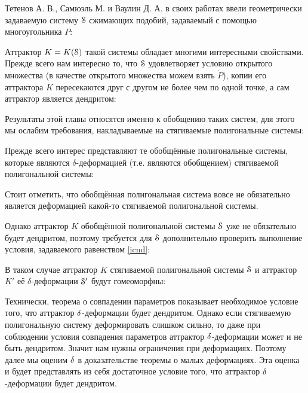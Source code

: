 Тетенов А. В., Самюэль М. и Ваулин Д. А. в своих работах \cite{TSV2017, STV2017} ввели геометрически задаваемую систему ${\EuScript S}$ сжимающих подобий, задаваемый с помощью многоугольника $P$:


Аттрактор $K=K({\EuScript S})$ такой системы обладает многими интересными свойствами.
Прежде всего нам интересно то, что ${\EuScript S}$ удовлетворяет условию открытого множества (в качестве открытого множества можем взять $\dot P$), копии его аттрактора $K$ пересекаются друг с другом не более чем по одной точке, а сам аттрактор является дендритом:


Результаты этой главы относятся именно к обобщению таких систем, для этого мы ослабим требования, накладываемые на стягиваемые полигональные системы:


Прежде всего интерес представляют те обобщённые полигональные системы, которые являются $\delta$-деформацией (т.е. являются обобщением) стягиваемой полигональной системы:


Стоит отметить, что обобщённая полигональная система вовсе не обязательно является деформацией какой-то стягиваемой полигональной системы.

Однако аттрактор $K$ обобщённой полигональной системы ${\EuScript S}$ уже не обязательно будет дендритом, поэтому требуется для ${\EuScript S}$ дополнительно проверить выполнение условия, задаваемого равенством \eqref{icnd}:


В таком случае аттрактор $K$ стягиваемой полигональной системы ${\EuScript S}$ и аттрактор $K'$ её $\delta$-деформации ${\EuScript S}'$ будут гомеоморфны:


%
%
%


Технически, теорема о совпадении параметров показывает необходимое условие того, что аттрактор $\delta$-деформации будет дендритом. 
Однако если стягиваемую полигональную систему деформировать слишком сильно, то даже при соблюдении условия совпадения параметров аттрактор $\delta$-деформации может и не быть дендритом. 
Значит нам нужны ограничения при деформациях. 
Поэтому далее мы оценим $\delta$ в доказательстве теоремы о малых деформациях. 
Эта оценка и будет представлять из себя достаточное условие того, что аттрактор $\delta$-деформации будет дендритом.


